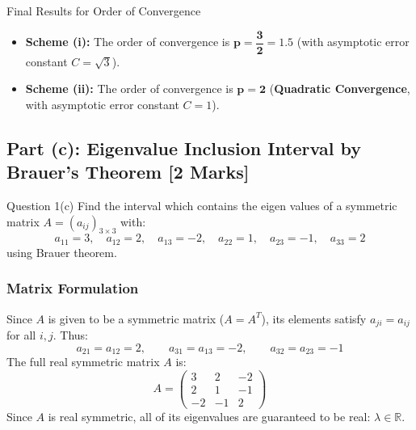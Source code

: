 \documentclass[11pt,a4paper]{article}
\newcommand{\R}{\mathbb{R}}
\begin{document}
\begin{answerbox}{Final Results for Order of Convergence}
\begin{itemize}[leftmargin=*]
    \item \textbf{Scheme (i):} The order of convergence is $\mathbf{p = \dfrac{3}{2} = 1.5}$ (with asymptotic error constant $C = \sqrt{3}$).
    \item \textbf{Scheme (ii):} The order of convergence is $\mathbf{p = 2}$ (\textbf{Quadratic Convergence}, with asymptotic error constant $C = 1$).
\end{itemize}
\end{answerbox}

\vspace{10pt}

\subsection*{Part (c): Eigenvalue Inclusion Interval by Brauer's Theorem \hfill \normalsize\normalfont\color{darkgray}[2 Marks]}

\begin{questionbox}{Question 1(c)}
Find the interval which contains the eigen values of a symmetric matrix $A = (a_{ij})_{3 \times 3}$ with:
\[
a_{11} = 3, \quad a_{12} = 2, \quad a_{13} = -2, \quad a_{22} = 1, \quad a_{23} = -1, \quad a_{33} = 2
\]
using Brauer theorem.
\end{questionbox}

\subsubsection*{Matrix Formulation}
Since $A$ is given to be a symmetric matrix ($A = A^T$), its elements satisfy $a_{ji} = a_{ij}$ for all $i, j$. Thus:
\[
a_{21} = a_{12} = 2, \qquad a_{31} = a_{13} = -2, \qquad a_{32} = a_{23} = -1
\]
The full real symmetric matrix $A$ is:
\begin{equation}
A = \begin{pmatrix}
3 & 2 & -2 \\
2 & 1 & -1 \\
-2 & -1 & 2
\end{pmatrix}
\end{equation}
Since $A$ is real symmetric, all of its eigenvalues are guaranteed to be real: $\lambda \in \R$.
\end{document}
